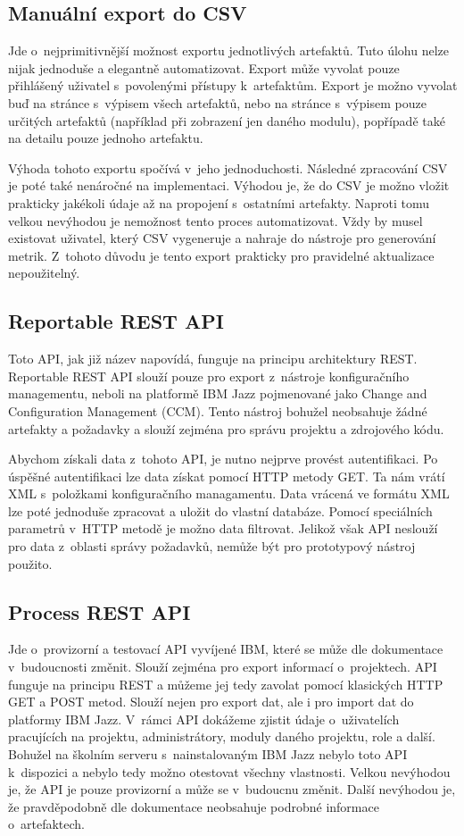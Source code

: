 \documentclass[czech,master]{diploma}
\begin{document}
\subsection{Manuální export do CSV}
Jde o~nejprimitivnější možnost exportu jednotlivých artefaktů. Tuto úlohu nelze nijak jednoduše a elegantně automatizovat. Export může vyvolat pouze přihlášený uživatel s~povolenými přístupy k~artefaktům. Export je možno vyvolat buď na stránce s~výpisem všech artefaktů, nebo na stránce s~výpisem pouze určitých artefaktů (například při zobrazení jen daného modulu), popřípadě také na detailu pouze jednoho artefaktu.

Výhoda tohoto exportu spočívá v~jeho jednoduchosti. Následné zpracování CSV je poté také nenáročné na implementaci. Výhodou je, že do CSV je možno vložit prakticky jakékoli údaje až na propojení s~ostatními artefakty. Naproti tomu velkou nevýhodou je nemožnost tento proces automatizovat. Vždy by musel existovat uživatel, který CSV vygeneruje a nahraje do nástroje pro generování metrik. Z~tohoto důvodu je tento export prakticky pro pravidelné aktualizace nepoužitelný.

\subsection{Reportable REST API}
Toto API, jak již název napovídá, funguje na principu architektury REST. Reportable REST API slouží pouze pro export z~nástroje konfiguračního managementu, neboli na platformě IBM Jazz pojmenované jako Change and Configuration Management (CCM). Tento nástroj bohužel neobsahuje žádné artefakty a požadavky a slouží zejména pro správu projektu a zdrojového kódu.

Abychom získali data z~tohoto API, je nutno nejprve provést autentifikaci. Po úspěšné autentifikaci lze data získat pomocí HTTP metody GET. Ta nám vrátí XML s~položkami konfiguračního managamentu. Data vrácená ve formátu XML lze poté jednoduše zpracovat a uložit do vlastní databáze. Pomocí speciálních parametrů v~HTTP metodě je možno data filtrovat. Jelikož však API neslouží pro data z~oblasti správy požadavků, nemůže být pro prototypový nástroj použito.

\subsection{Process REST API}
Jde o~provizorní a testovací API vyvíjené IBM, které se může dle dokumentace v~budoucnosti změnit. Slouží zejména pro export informací o~projektech. API funguje na principu REST a můžeme jej tedy  zavolat pomocí klasických HTTP GET a POST metod. Slouží nejen pro export dat, ale i pro import dat do platformy IBM Jazz. V~rámci API dokážeme zjistit údaje o~uživatelích pracujících na projektu, administrátory, moduly daného projektu, role a další. Bohužel na školním serveru s~nainstalovaným IBM Jazz nebylo toto API k~dispozici a nebylo tedy možno otestovat všechny vlastnosti. Velkou nevýhodou je, že API je pouze provizorní a může se v~budoucnu změnit. Další nevýhodou je, že pravděpodobně dle dokumentace neobsahuje podrobné informace o~artefaktech.
\end{document}
